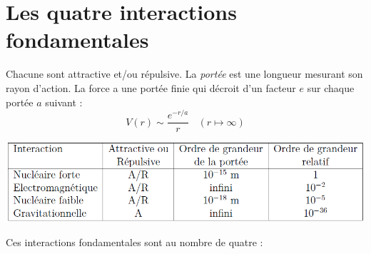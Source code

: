 \documentclass[british,french,11pt, a4paper, openany]{book}
\begin{document}
	\section{Les quatre interactions fondamentales}
	Chacune sont attractive et/ou répulsive. La \textit{portée} est une longueur mesurant son rayon d'action. La force a une portée finie qui décroit d'un facteur $e$ sur chaque portée $a$ suivant :
	\begin{equation}
		V(r) \sim \frac{e^{-r/a}}{r}\ \ \ \ (r \mapsto \infty)
	\end{equation}
	\begin{center}
		\includegraphics[scale=0.5]{img/interf}
	\end{center}
	Ces interactions fondamentales sont au nombre de quatre :
\end{document}

